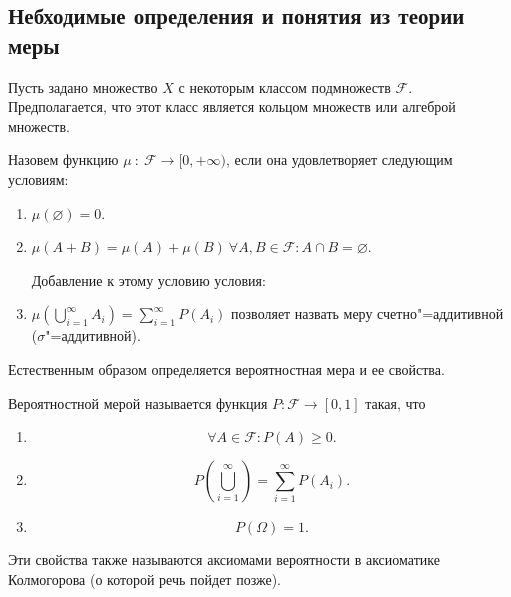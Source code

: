 \subsection{Небходимые определения и понятия из теории меры}
Пусть задано множество $X$ с некоторым классом подмножеств $\mathcal{F}$.
    Предполагается, что этот класс является кольцом множеств или алгеброй множеств.
\begin{definition}[Конечно"=аддитивная/счетно"=аддитивная мера множества]
    Назовем функцию $\mu ~:~ \mathcal{F} \rightarrow [0, +\infty)$, если она удовлетворяет
    следующим условиям:
    \begin{enumerate}
        \item $\mu(\varnothing) = 0$.
        \item $ \mu(A + B) = \mu(A) + \mu(B) ~\forall A, B \in \mathcal{F}: A \cap B = \varnothing$.
        
        Добавление к этому условию условия:
        \item $\mu(\bigcup\limits_{i = 1}^{\infty} A_i) = \sum\limits_{i = 1}^{\infty} P(A_i)$
        позволяет назвать меру счетно"=аддитивной ($\sigma$"=аддитивной).
    \end{enumerate}
\end{definition}

Естественным образом определяется вероятностная мера и ее свойства.
\begin{definition}
    Вероятностной мерой называется функция $P: \mathcal{F} \rightarrow [0, 1]$ такая, что
    \begin{enumerate}
        \item 
        \begin{equation}
            \label{ref1}
            \forall A \in \mathcal{F}: P(A) \ge 0.
        \end{equation}
        \item
        \begin{equation}
            \label{ref2}
            P(\bigcup\limits_{i = 1}^\infty) = \sum\limits_{i = 1}^\infty P(A_i).
        \end{equation}
        \item
        \begin{equation}
            \label{ref3}
            P(\Omega) = 1. 
        \end{equation}
    \end{enumerate}
    Эти свойства также называются аксиомами вероятности в аксиоматике Колмогорова (о которой речь пойдет позже).
\end{definition}

